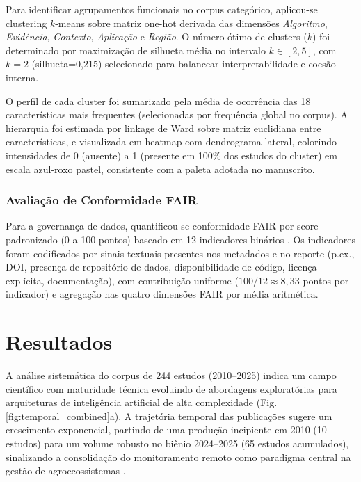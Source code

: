 Para identificar agrupamentos funcionais no corpus categórico, aplicou-se clustering $k$-means sobre matriz one-hot derivada das dimensões \textit{Algoritmo}, \textit{Evidência}, \textit{Contexto}, \textit{Aplicação} e \textit{Região}. O número ótimo de clusters ($k$) foi determinado por maximização de silhueta média no intervalo $k \in [2, 5]$, com $k=2$ (silhueta=0,215) selecionado para balancear interpretabilidade e coesão interna.

O perfil de cada cluster foi sumarizado pela média de ocorrência das 18 características mais frequentes (selecionadas por frequência global no corpus). A hierarquia foi estimada por linkage de Ward sobre matriz euclidiana entre características, e visualizada em heatmap com dendrograma lateral, colorindo intensidades de 0 (ausente) a 1 (presente em 100\% dos estudos do cluster) em escala azul-roxo pastel, consistente com a paleta adotada no manuscrito.

\subsubsection[Avaliação de Conformidade FAIR]{Avaliação de Conformidade FAIR}

Para a governança de dados, quantificou-se conformidade FAIR por score padronizado (0 a 100 pontos) baseado em 12 indicadores binários \cite{Wilkinson2016}. Os indicadores foram codificados por sinais textuais presentes nos metadados e no reporte (p.ex., DOI, presença de repositório de dados, disponibilidade de código, licença explícita, documentação), com contribuição uniforme ($100/12 \approx 8{,}33$ pontos por indicador) e agregação nas quatro dimensões FAIR por média aritmética.

\section[Resultados]{Resultados}\label{sec:resultados}

A análise sistemática do corpus de 244 estudos (2010--2025) indica um campo científico com maturidade técnica evoluindo de abordagens exploratórias para arquiteturas de inteligência artificial de alta complexidade (Fig. \ref{fig:temporal_combined}a). A trajetória temporal das publicações sugere um crescimento exponencial, partindo de uma produção incipiente em 2010 (10 estudos) para um volume robusto no biênio 2024--2025 (65 estudos acumulados), sinalizando a consolidação do monitoramento remoto como paradigma central na gestão de agroecossistemas \cite{Weiss2020,Osco2021}.

